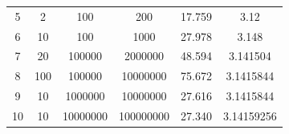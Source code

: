 \documentclass{article}
\begin{document}
\begin{table}[htbp]
\begin{tabular}{cccccc}
5                   & 2                                                                 & 100                                                                  & 200                                                                    & 17.759                                                             & 3.12                                                            \\
6                   & 10                                                                & 100                                                                  & 1000                                                                   & 27.978                                                             & 3.148                                                           \\
7                   & 20                                                                & 100000                                                               & 2000000                                                                & 48.594                                                             & 3.141504                                                        \\
8                   & 100                                                               & 100000                                                               & 10000000                                                               & 75.672                                                             & 3.1415844                                                       \\
9                   & 10                                                                & 1000000                                                              & 10000000                                                               & 27.616                                                             & 3.1415844                                                       \\
10                  & 10                                                                & 10000000                                                             & 100000000                                                              & 27.340                                                             & 3.14159256                                                      \\ \hline
\end{tabular}
\end{table}
\end{document}
